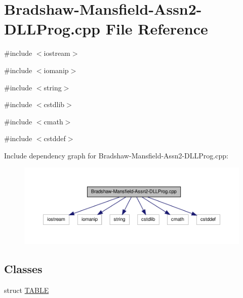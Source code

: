 \hypertarget{_bradshaw-_mansfield-_assn2-_d_l_l_prog_8cpp}{
\section{Bradshaw-\/Mansfield-\/Assn2-\/DLLProg.cpp File Reference}
\label{_bradshaw-_mansfield-_assn2-_d_l_l_prog_8cpp}
}
{\ttfamily \#include $<$iostream$>$}\par
{\ttfamily \#include $<$iomanip$>$}\par
{\ttfamily \#include $<$string$>$}\par
{\ttfamily \#include $<$cstdlib$>$}\par
{\ttfamily \#include $<$cmath$>$}\par
{\ttfamily \#include $<$cstddef$>$}\par
Include dependency graph for Bradshaw-\/Mansfield-\/Assn2-\/DLLProg.cpp:
\nopagebreak
\begin{figure}[H]
\begin{center}
\leavevmode
\includegraphics[width=400pt]{_bradshaw-_mansfield-_assn2-_d_l_l_prog_8cpp__incl}
\end{center}
\end{figure}
\subsection*{Classes}
\begin{DoxyCompactItemize}
\item 
struct \hyperlink{struct_t_a_b_l_e}{TABLE}
\end{DoxyCompactItemize}

